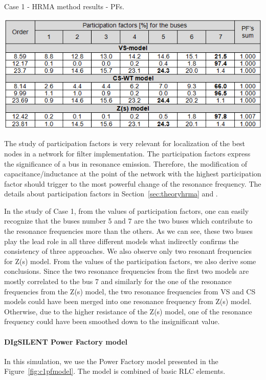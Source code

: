 \documentclass[12pt]{report} %
\begin{document}
\begin{table}[htb]
	\caption{Case 1 - HRMA method results - PFs.}
	\label{tab:case1tablehrma2}
	\centering
	\includegraphics[width=1\textwidth]{img/Case1/table_HRMA2.png}
\end{table}
\FloatBarrier

The study of participation factors is very relevant for localization of the best nodes in a network for filter implementation. The participation factors express the significance of a bus in resonance emission. Therefore, the modification of capacitance/inductance at the point of the network with the highest participation factor should trigger to the most powerful change of the resonance frequency. The details about participation factors in Section~\ref{sec:theoryhrma} and \cite{xu2005}.

In the study of Case 1, from the values of participation factors, one can easily recognize that the buses number 5 and 7 are the two buses which contribute to the resonance frequencies more than the others. As we can see, these two buses play the lead role in all three different models what indirectly confirms the consistency of three approaches. We also observe only two resonant frequencies for Z(s) model. From the values of the participation factors, we also derive some conclusions. Since the two resonance frequencies from the first two models are mostly correlated to the bus 7 and similarly for the one of the resonance frequencies from the Z(s) model, the two resonance frequencies from VS and CS models could have been merged into one resonance frequency from Z(s) model. Otherwise, due to the higher resistance of the Z(s) model, one of the resonance frequency could have been smoothed down to the insignificant value.

\paragraph{DIgSILENT Power Factory model}
In this simulation, we use the Power Factory model presented in the Figure~\ref{fig:c1pfmodel}. The model is combined of basic RLC elements.
\end{document}
